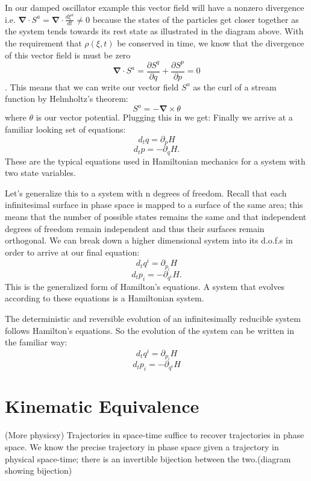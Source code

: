 \documentclass{article}
\begin{document}
	In our damped oscillator example this vector field will have a nonzero divergence i.e. $\mathbf{\nabla} \cdot S^a =\mathbf{\nabla} \cdot \frac{d\xi^a}{dt} \neq 0$ because the states of the particles get closer together as the system tends towards its rest state as illustrated in the diagram above. With the requirement that $\rho(\xi,t)$ be conserved in time, we know that the divergence of this vector field is must be zero $$\mathbf{\nabla} \cdot S^a = \frac{\partial S^q}{\partial q} + \frac{\partial S^p}{\partial p} = 0$$. This means that we can write our vector field $S^a$ as the curl of a stream function by Helmholtz's theorem: $$S^a = -\mathbf{\nabla} \times \theta$$ where $\theta$ is our vector potential. Plugging this in we get: Finally we arrive at a familiar looking set of equations: $$d_t q = \partial _{p} H$$ $$d_t p = -\partial _q H.$$ These are the typical equations used in Hamiltonian mechanics for a system with two state variables.
	
	Let's generalize this to a system with n degrees of freedom. Recall that each infinitesimal surface in phase space is mapped to a surface of the same area; this means that the number of possible states remains the same and that independent degrees of freedom remain independent and thus their surfaces remain orthogonal. We can break down a higher dimensional system into its d.o.f.s in order to arrive at our final equation: $$d_tq^i = \partial_{p_i}H$$ $$d_tp_i = -\partial_{q^i}H.$$ This is the generalized form of Hamilton's equations. A system that evolves according to these equations is a Hamiltonian system.

\begin{prop}
	The deterministic and reversible evolution of an infinitesimally reducible system follows Hamilton's equations. So the evolution of the system can be written in the familiar way:
	$$d_tq^i = \partial_{p_i}H$$
	$$d_tp_i = -\partial_{q^i}H$$
\end{prop} 

\iffalse
\section{Kinematic Equivalence}

\begin{assump}
	(More physicsy) Trajectories in space-time suffice to recover trajectories in phase space. We know the precise trajectory in phase space given a trajectory in physical space-time; there is an invertible bijection between the two.(diagram showing bijection)
\end{assump}
\end{document}
